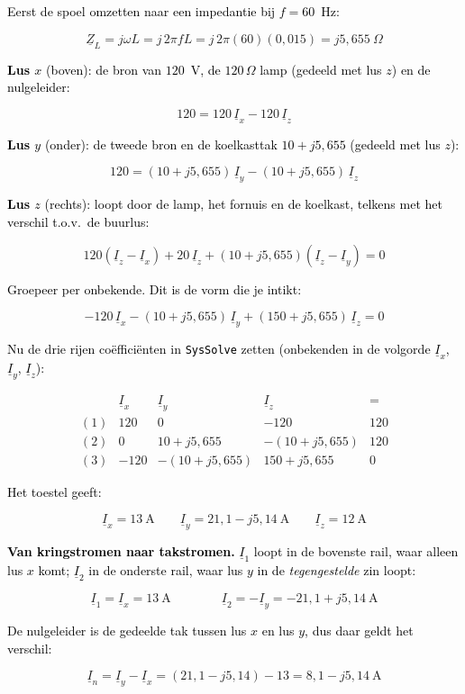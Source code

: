 \documentclass[a4paper,11pt]{article}
\newcommand{\stapreden}[1]{\par\vspace{1.4mm}\noindent\textcolor{black}{#1}\par\vspace{-2mm}}
\begin{document}
\begin{oefening}
    \stapreden{Eerst de spoel omzetten naar een impedantie bij $f = 60$~Hz:}
    \[\underline{Z}_L = j\omega L = j\,2\pi f L = j\,2\pi(60)(0{,}015) = j5{,}655\ \Omega\]

    \stapreden{\textbf{Lus $x$} (boven): de bron van $120$~V, de $120\,\Omega$ lamp (gedeeld met lus $z$) en de nulgeleider:}
    \[120 = 120\,\underline{I}_x - 120\,\underline{I}_z \tag{1}\]

    \stapreden{\textbf{Lus $y$} (onder): de tweede bron en de koelkasttak $10 + j5{,}655$ (gedeeld met lus $z$):}
    \[120 = (10 + j5{,}655)\,\underline{I}_y - (10 + j5{,}655)\,\underline{I}_z \tag{2}\]

    \stapreden{\textbf{Lus $z$} (rechts): loopt door de lamp, het fornuis en de koelkast, telkens met het verschil t.o.v.\ de buurlus:}
    \[120(\underline{I}_z - \underline{I}_x) + 20\,\underline{I}_z
        + (10+j5{,}655)(\underline{I}_z - \underline{I}_y) = 0\]

    \stapreden{Groepeer per onbekende. Dit is de vorm die je intikt:}
    \[-120\,\underline{I}_x - (10+j5{,}655)\,\underline{I}_y + (150 + j5{,}655)\,\underline{I}_z = 0 \tag{3}\]

    \stapreden{Nu de drie rijen co\"effici\"enten in \texttt{SysSolve} zetten (onbekenden in de volgorde $\underline{I}_x$, $\underline{I}_y$, $\underline{I}_z$):}
    \[\begin{array}{r|rrr|r}
          & \underline{I}_x & \underline{I}_y & \underline{I}_z & = \\
        \hline
        (1) & 120  & 0             & -120           & 120 \\
        (2) & 0    & 10+j5{,}655   & -(10+j5{,}655) & 120 \\
        (3) & -120 & -(10+j5{,}655)& 150+j5{,}655   & 0
    \end{array}\]

    \stapreden{Het toestel geeft:}
    \[\underline{I}_x = 13\ \text{A} \qquad
      \underline{I}_y = 21{,}1 - j5{,}14\ \text{A} \qquad
      \underline{I}_z = 12\ \text{A}\]

    \stapreden{\textbf{Van kringstromen naar takstromen.} $\underline{I}_1$ loopt in de bovenste rail, waar alleen lus $x$ komt; $\underline{I}_2$ in de onderste rail, waar lus $y$ in de \emph{tegengestelde} zin loopt:}
    \[\underline{I}_1 = \underline{I}_x = \boxed{13\ \text{A}}
        \qquad\qquad
        \underline{I}_2 = -\underline{I}_y = \boxed{-21{,}1 + j5{,}14\ \text{A}}\]

    \stapreden{De nulgeleider is de gedeelde tak tussen lus $x$ en lus $y$, dus daar geldt het verschil:}
    \[\underline{I}_n = \underline{I}_y - \underline{I}_x = (21{,}1 - j5{,}14) - 13
        = \boxed{8{,}1 - j5{,}14\ \text{A}}\]


\end{oefening}
\end{document}
